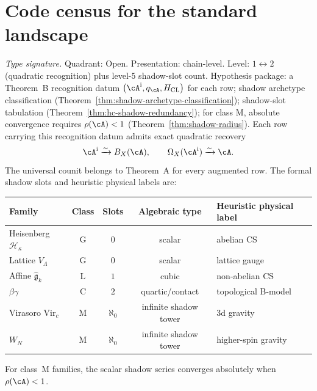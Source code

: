%
%

\section{Code census for the standard landscape}
\label{sec:hc-census}

\begin{theorem}
\label{thm:hc-census}
\textit{Type signature.} Quadrant: Open. Presentation: chain-level.
Level: $1\!\leftrightarrow\!2$ (quadratic recognition) plus level-$5$
shadow-slot count. Hypothesis package: a Theorem~B recognition datum
$\bigl(\cA^{\mathrm i},q_\cA,H_{\mathrm{CL}}\bigr)$ for each row;
shadow archetype classification
(Theorem~\textup{\ref{thm:shadow-archetype-classification}});
shadow-slot tabulation
(Theorem~\textup{\ref{thm:hc-shadow-redundancy}}); for class M,
absolute convergence requires
$\rho(\cA) < 1$
(Theorem~\textup{\ref{thm:shadow-radius}}).
\smallskip\noindent
Each row carrying this recognition datum admits exact quadratic
recovery
\[
\cA^{\mathrm i}\xrightarrow{\sim}B_X(\cA),
\qquad
\Omega_X(\cA^{\mathrm i})\xrightarrow{\sim}\cA.
\]
The universal counit belongs to Theorem~A for every augmented row.
The formal shadow slots and heuristic physical labels are:

\begin{center}
\renewcommand{\arraystretch}{1.3}
\small
\begin{tabular}{l@{\;\;}c@{\;\;}c@{\;\;}c@{\;\;}l}
\textbf{Family} & \textbf{Class} & \textbf{Slots}
& \textbf{Algebraic type} & \textbf{Heuristic physical label} \\
\midrule
Heisenberg $\mathcal{H}_\kappa$
 & G & $0$ & scalar & abelian CS \\
Lattice $V_\Lambda$
 & G & $0$ & scalar & lattice gauge \\
Affine $\widehat{\mathfrak{g}}_k$
 & L & $1$ & cubic & non-abelian CS \\
$\beta\gamma$
 & C & $2$ & quartic/contact & topological B-model \\
Virasoro $\mathrm{Vir}_c$
 & M & $\aleph_0$ & infinite shadow tower & 3d gravity \\
$W_N$
 & M & $\aleph_0$ & infinite shadow tower & higher-spin gravity
\end{tabular}
\end{center}
For class~M families, the scalar shadow series converges absolutely
when $\rho(\cA) < 1$.
\end{theorem}


